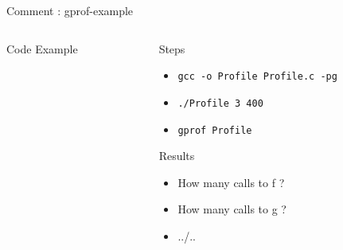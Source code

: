 \begin{frame}[fragile]{Comment : gprof-example}

  \begin{columns}[t]
   \begin{column}{\BW}
     \begin{block}{Code Example}

     \end{block}
   \end{column}
   \begin{column}{\BW}
     \begin{block}{Steps}
       \begin{itemize}
       \item \texttt{gcc -o Profile Profile.c -pg }
       \item \texttt{./Profile 3 400}
       \item \texttt{gprof Profile}
       \end{itemize}
     \end{block}
     \begin{block}{Results}
       \begin{itemize}
       \item How many calls to f ?
       \item How many calls to g ?
       \item ../..
       \end{itemize}
     \end{block}
   \end{column}
  \end{columns}
\end{frame}
